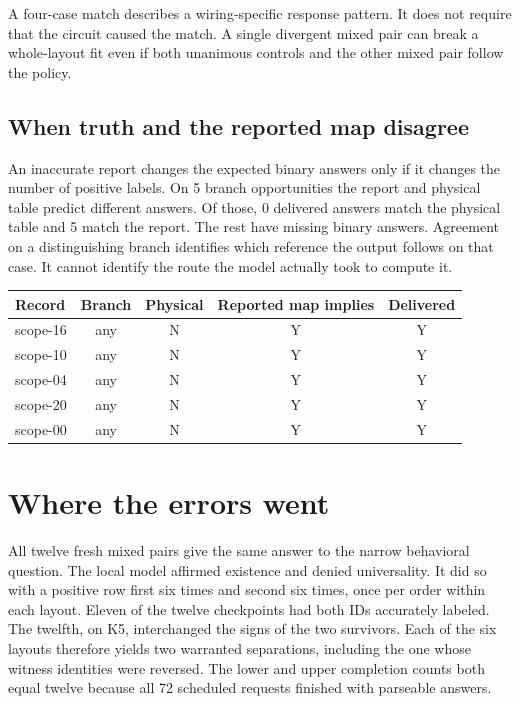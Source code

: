 \documentclass[12pt,letterpaper]{article}
\begin{document}
A four-case match describes a wiring-specific response pattern. It does not require that the circuit caused the match. A single divergent mixed pair can break a whole-layout fit even if both unanimous controls and the other mixed pair follow the policy.

\subsection{When truth and the reported map disagree}

An inaccurate report changes the expected binary answers only if it changes the number of positive labels. On 5 branch opportunities the report and physical table predict different answers. Of those, 0 delivered answers match the physical table and 5 match the report. The rest have missing binary answers. Agreement on a distinguishing branch identifies which reference the output follows on that case. It cannot identify the route the model actually took to compute it.

\begin{center}{\small\setlength{\tabcolsep}{4pt}\begin{tabularx}{\linewidth}{@{}Ycccc@{}}\toprule
Record & Branch & Physical & Reported map implies & Delivered\\\midrule
scope-16 & any & N & Y & Y\\
scope-10 & any & N & Y & Y\\
scope-04 & any & N & Y & Y\\
scope-20 & any & N & Y & Y\\
scope-00 & any & N & Y & Y\\
\bottomrule\end{tabularx}}\end{center}

\section{Where the errors went}
All twelve fresh mixed pairs give the same answer to the narrow behavioral question. The local model affirmed existence and denied universality. It did so with a positive row first six times and second six times, once per order within each layout. Eleven of the twelve checkpoints had both IDs accurately labeled. The twelfth, on K5, interchanged the signs of the two survivors. Each of the six layouts therefore yields two warranted separations, including the one whose witness identities were reversed. The lower and upper completion counts both equal twelve because all 72 scheduled requests finished with parseable answers.
\end{document}
